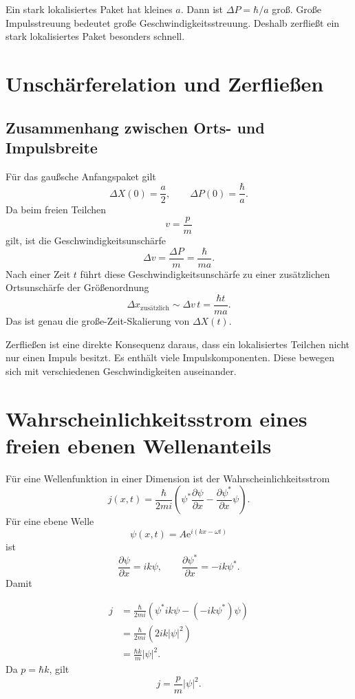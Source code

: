 \begin{notebox}
Ein stark lokalisiertes Paket hat kleines $a$. Dann ist $\Delta P=\hbar/a$ groß. Große Impulsstreuung bedeutet große Geschwindigkeitsstreuung. Deshalb zerfließt ein stark lokalisiertes Paket besonders schnell.
\end{notebox}

\section{Unschärferelation und Zerfließen}

\subsection{Zusammenhang zwischen Orts- und Impulsbreite}

Für das gaußsche Anfangspaket gilt
\[
    \Delta X(0)=\frac{a}{2},
    \qquad
    \Delta P(0)=\frac{\hbar}{a}.
\]
Da beim freien Teilchen
\[
    v=\frac{p}{m}
\]
gilt, ist die Geschwindigkeitsunschärfe
\[
    \Delta v=\frac{\Delta P}{m}=\frac{\hbar}{ma}.
\]
Nach einer Zeit $t$ führt diese Geschwindigkeitsunschärfe zu einer zusätzlichen Ortsunschärfe der Größenordnung
\[
    \Delta x_\text{zusätzlich}\sim \Delta v\,t
    =\frac{\hbar t}{ma}.
\]
Das ist genau die große-Zeit-Skalierung von $\Delta X(t)$.

\begin{conceptbox}
Zerfließen ist eine direkte Konsequenz daraus, dass ein lokalisiertes Teilchen nicht nur einen Impuls besitzt. Es enthält viele Impulskomponenten. Diese bewegen sich mit verschiedenen Geschwindigkeiten auseinander.
\end{conceptbox}

\section{Wahrscheinlichkeitsstrom eines freien ebenen Wellenanteils}

Für eine Wellenfunktion in einer Dimension ist der Wahrscheinlichkeitsstrom
\[
    j(x,t)=\frac{\hbar}{2mi}\left(\psi^*\frac{\partial\psi}{\partial x}
    -\frac{\partial\psi^*}{\partial x}\psi\right).
\]
Für eine ebene Welle
\[
    \psi(x,t)=A\mathrm{e}^{i(kx-\omega t)}
\]
ist
\[
    \frac{\partial\psi}{\partial x}=ik\psi,
    \qquad
    \frac{\partial\psi^*}{\partial x}=-ik\psi^*.
\]
Damit
\begin{derivationbox}
\[
\begin{aligned}
    j
    &=\frac{\hbar}{2mi}\left(\psi^*ik\psi-(-ik\psi^*)\psi\right) \\
    &=\frac{\hbar}{2mi}\left(2ik|\psi|^2\right) \\
    &=\frac{\hbar k}{m}|\psi|^2.
\end{aligned}
\]
Da $p=\hbar k$, gilt
\[
    j=\frac{p}{m}|\psi|^2.
\]
\end{derivationbox}

